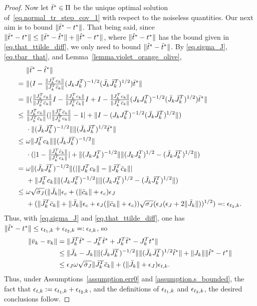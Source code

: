 \begin{proof}
  Now let ${\bar t}^* \in \Pi$ be the unique optimal solution of~\eqref{eq.normal_tr_step_cov_1} with respect to the noiseless quantities.  Our next aim is to bound $\|{\bar t}^* - t^* \|$.  That being said, since $\|{\bar t}^* - t^* \| \leq \| {\bar t}^* - {\hat t}^* \| + \| {\hat t}^* -  t^* \|$, where $\| {\hat t}^* -  t^* \|$ has the bound given in \eqref{eq.that_ttilde_diff}, we only need to bound $\| {\hat t}^* - {\bar t}^* \|$.  By \eqref{eq.sigma_J}, \eqref{eq.tbar_that}, and Lemma~\ref{lemma.violet_orange_olive},
  \begin{align*}
    &\ \| {\bar t}^* - {\hat t}^* \| \\
    =&\ \| ( I - {\tfrac{\|J_k^Tc_k\|}{\|{\bar J}_k^T{\bar c}_k\|}} (J_k J_k^T)^{-1/2} ({\bar J}_k {\bar J}_k^T)^{1/2} ) {\bar t}^* \| \\
    =&\ \| ( {\tfrac{\|J_k^Tc_k\|}{\|{\bar J}_k^T{\bar c}_k\|}} I - {\tfrac{\|J_k^Tc_k\|}{\|{\bar J}_k^T{\bar c}_k\|}} I + I - {\tfrac{\|J_k^Tc_k\|}{\|{\bar J}_k^T{\bar c}_k\|}} (J_k J_k^T)^{-1/2} ({\bar J}_k {\bar J}_k^T)^{1/2} ) {\bar t}^* \| \\
    \leq&\ {\tfrac{\|J_k^Tc_k\|}{\|{\bar J}_k^T{\bar c}_k\|}} ( |\tfrac{\|{\bar J}_k^T {\bar c}_k\|}{\|J_k^T c_k\|} - 1 | + \|I - (J_k J_k^T)^{-1/2} ({\bar J}_k {\bar J}_k^T)^{1/2} \| ) \\
    &\ \cdot \| ({\bar J}_k {\bar J}_k^T)^{-1/2} \| \| ({\bar J}_k {\bar J}_k^T)^{1/2} {\bar t}^* \| \\
    \leq&\ \omega \|J_k^T c_k\| \| ({\bar J}_k {\bar J}_k^T)^{-1/2} \| \\
    &\ \cdot ( | 1 - \tfrac{\|{\bar J}_k^T {\bar c}_k\|}{\|J_k^T c_k\|} | + \| (J_k J_k^T)^{-1/2} \| \| (J_k J_k^T)^{1/2} - ({\bar J}_k {\bar J}_k^T)^{1/2} \| ) \\
    =&\ \omega \| ({\bar J}_k {\bar J}_k^T)^{-1/2} \| ( |  \|J_k^T c_k\| - \|{\bar J}_k^T {\bar c}_k\|| \\
    &\ +\|J_k^T c_k\|  \| (J_k J_k^T)^{-1/2} \| \| (J_k J_k^T)^{1/2} - ({\bar J}_k {\bar J}_k^T)^{1/2} \| ) \\
    \leq&\ \omega \sqrt{{\bar \sigma}_J} ( \|{\bar J}_k\| \epsilon_c + (\|{\bar c}_k\| + \epsilon_c) \epsilon_J \\
    &\ + ( \|{\bar J}_k^T {\bar c}_k\| + \|{\bar J}_k\| \epsilon_c + \epsilon_J (\|{\bar c}_k\| +  \epsilon_c)) \sqrt{\sigma_J} (\epsilon_J (\epsilon_J + 2 \|{\bar J}_k\| ) )^{1/2} ) =: \epsilon_{t_2,k}.
  \end{align*}
  Thus, with \eqref{eq.sigma_J} and \eqref{eq.that_ttilde_diff}, one has $\|\hat t^* - t^* \| \leq \epsilon_{t_1,k} + \epsilon_{t_2,k} =: \epsilon_{t,k}$, so
  \begin{align*}\label{eq.eps_v}
    \|{\bar v}_k - v_k \|
      &= \| {\bar J}_k^T \hat t^* - J_k^T \hat t^* + J_k^T \hat t^* - J_k^T t^* \| \\
      &\leq \| {\bar J}_k - J_k \| \| ({\bar J}_k {\bar J}_k^T)^{-1/2} \| \| ({\bar J}_k {\bar J}_k^T)^{1/2} \hat t^* \| + \| J_k \| \| \hat t^* - t^* \| \\
      &\leq \epsilon_J \omega \sqrt{{\bar \sigma}_J}  \| {\bar J}_k^T {\bar c}_k\| + (\|{\bar J}_k\| + \epsilon_J) \epsilon_{t,k}.
  \end{align*}
  Thus, under Assumptions~\ref{assumption.err0} and \ref{assumption.s_bounded}, the fact that $\epsilon_{t,k} := \epsilon_{t_1,k} + \epsilon_{t_2,k}$, and the definitions of $\epsilon_{t_1,k}$ and $\epsilon_{t_2,k}$, the desired conclusions follow.
\end{proof}

